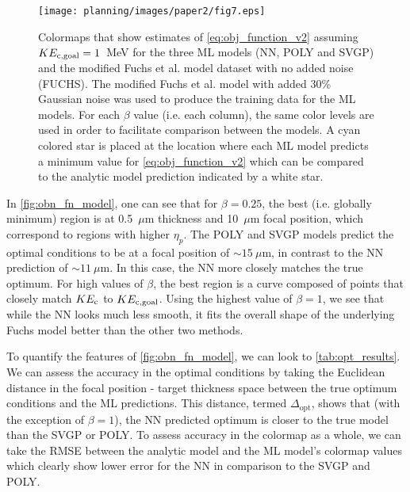 \begin{figure}
	\centering
	\texttt{[image: planning/images/paper2/fig7.eps]}
	\vspace{-0.4cm}
	\caption{Colormaps that show estimates of \autoref{eq:obj_function_v2} assuming $KE_{\rm c,goal} = 1$~MeV for the three ML models (NN, POLY and SVGP) and the modified Fuchs et al. model dataset with no added noise (FUCHS). The modified Fuchs et al. model with added 30\% Gaussian noise was used to produce the training data for the ML models.
	For each $\beta$ value (i.e. each column), the same color levels are used in order to facilitate comparison between the models. A cyan colored star is placed at the location where each ML model predicts a minimum value for \autoref{eq:obj_function_v2} which can be compared to the analytic model prediction indicated by a white star.}
	\label{fig:obn_fn_model}
\end{figure}

In \autoref{fig:obn_fn_model}, one can see that for $\beta = 0.25$, the best (i.e. globally minimum) region is at 0.5~$\mu$m thickness and 10~$\mu$m focal position, which correspond to regions with higher $\eta_{p}$. The \gls{POLY} and \gls{SVGP} models predict the optimal conditions to be at a focal position of $\sim15~\mu$m, in contrast to the \gls{NN} prediction of $\sim11~\mu$m. In this case, the \gls{NN} more closely matches the true optimum. For high values of $\beta$, the best region is a curve composed of points that closely match $KE_{\rm c}$ to $KE_{\rm c,goal}$. Using the highest value of $\beta = 1$, we see that while the \gls{NN} looks much less smooth, it fits the overall shape of the underlying Fuchs model better than the other two methods.

To quantify the features of \autoref{fig:obn_fn_model}, we can look to \autoref{tab:opt_results}. We can assess the accuracy in the optimal conditions by taking the Euclidean distance in the focal position - target thickness space between the true optimum conditions and the \gls{ML} predictions. This distance, termed $\Delta_\text{opt}$, shows that (with the exception of $\beta=1$), the \gls{NN} predicted optimum is closer to the true model than the \gls{SVGP} or \gls{POLY}. To assess accuracy in the colormap as a whole, we can take the \gls{RMSE} between the analytic model and the ML model's colormap values which clearly show lower error for the \gls{NN} in comparison to the \gls{SVGP} and \gls{POLY}.

